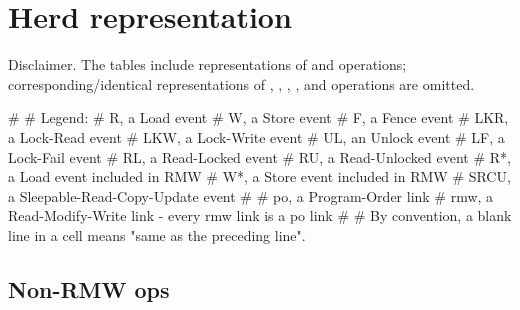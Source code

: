 \section{Herd representation}
\label{sec:lkmm:Herd representation}

\begin{Note}
  Disclaimer.
  The tables include representations of  and  operations;
  corresponding/identical representations of , , 
  , , and  operations are omitted.
\end{Note}

\begin{VerbatimU}
#
# Legend:
#	R,	a Load event
#	W,	a Store event
#	F,	a Fence event
#	LKR,	a Lock-Read event
#	LKW,	a Lock-Write event
#	UL,	an Unlock event
#	LF,	a Lock-Fail event
#	RL,	a Read-Locked event
#	RU,	a Read-Unlocked event
#	R*,	a Load event included in RMW
#	W*,	a Store event included in RMW
#	SRCU,	a Sleepable-Read-Copy-Update event
#
#	po,	a Program-Order link
#	rmw,	a Read-Modify-Write link - every rmw link is a po link
#
# By convention, a blank line in a cell means "same as the preceding line".
\end{VerbatimU}

\subsection{Non-RMW ops}


